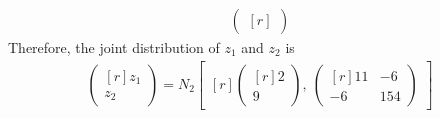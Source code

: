 \documentclass[12pt]{article} %
\begin{document}
\begin{enumerate}
\begin{enumerate}
\begin{enumerate}
\begin{eqnarray*}
\begin{pmatrix}[r]
					\end{pmatrix}
				\end{eqnarray*} 
				Therefore, the joint distribution of $z_{1}$ and $z_{2}$ is
				\begin{eqnarray*}
					\begin{pmatrix}[r]
						z_{1} \\
						z_{2}
					\end{pmatrix}=
					N_{2}
					\begin{bmatrix}[r]
						\begin{pmatrix}[r]
							2 \\
							9 						
						\end{pmatrix},~
						\begin{pmatrix}[r]
						 11 & -6 \\
					     -6 & 154						
						\end{pmatrix}						
					\end{bmatrix}
				\end{eqnarray*}
			\end{enumerate}
		

\end{enumerate}
\end{enumerate}
\end{document}

